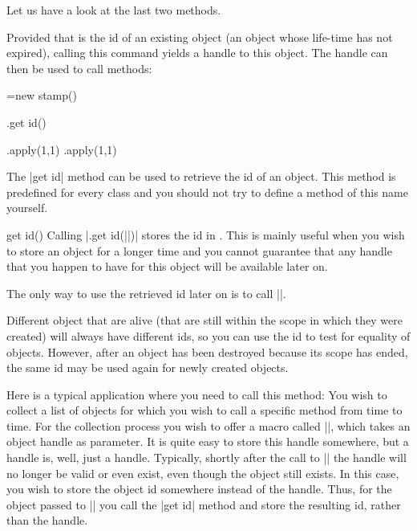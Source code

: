 Let us have a look at the last two methods.

\begin{command}{\pgfooobj{}}
    Provided that  is the id of an existing object (an object whose
    life-time has not expired), calling this command yields a handle to this
    object. The handle can then be used to call methods:
\begin{codeexample}
\pgfoonew \mystamp=new stamp()

\mystamp.get id(\myid)

\mystamp.apply(1,1)
\pgfooobj{\myid}.apply(1,1)
\end{codeexample}
\end{command}

The |get id| method can be used to retrieve the id of an object. This method is
predefined for every class and you should not try to define a method of this
name yourself.

\begin{predefinedmethod}{get id()}
    Calling |.get id(||)|  stores the id  in
    . This is mainly useful when you wish to store an object for a
    longer time and you cannot guarantee that any handle that you happen to
    have for this object will be available later on.

    The only way to use the retrieved id later on is to call |\pgfooobj|.

    Different object that are alive (that are still within the scope in which
    they were created) will always have different ids, so you can use the id to
    test for equality of objects. However, after an object has been destroyed
    because its scope has ended, the same id may be used again for newly
    created objects.

    Here is a typical application where you need to call this method: You wish
    to collect a list of objects for which you wish to call a specific method
    from time to time. For the collection process you wish to offer a macro
    called |\addtoobjectlist|, which takes an object handle as parameter. It is
    quite easy to store this handle somewhere, but a handle is, well, just a
    handle. Typically, shortly after the call to |\addtoobjectlist| the handle
    will no longer be valid or even exist, even though the object still exists.
    In this case, you wish to store the object id somewhere instead of the
    handle. Thus, for the object passed to |\addtoobjectlist| you call the
    |get id| method and store the resulting id, rather than the handle.
\end{predefinedmethod}

